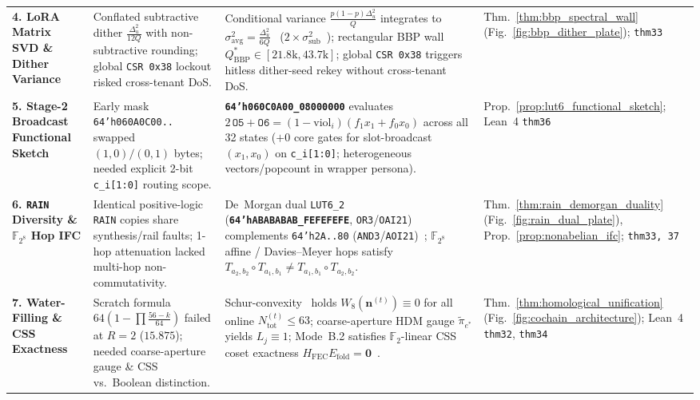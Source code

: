 \documentclass[10pt,twocolumn]{article}
\theoremstyle{spectralthm}
\begin{document}
\begin{table}[!tp]
\begin{tabularx}{\textwidth}{@{}>{\raggedright\hyphenpenalty=10000\arraybackslash}p{3.05cm} >{\raggedright\arraybackslash}p{4.85cm} >{\raggedright\arraybackslash}X >{\raggedright\arraybackslash}p{2.95cm}@{}}
\textbf{4. LoRA Matrix SVD \& Dither Variance} & Conflated subtractive dither $\frac{\Delta_u^2}{12Q}$ with non-subtractive rounding; global \texttt{CSR 0x38} lockout risked cross-tenant DoS. & Conditional variance $\frac{p(1-p)\Delta_u^2}{Q}$ integrates to $\sigma_{\mathrm{avg}}^2 = \frac{\Delta_u^2}{6Q}$~\cite{wannamaker2000nonsubtractive} ($2\times \sigma_{\mathrm{sub}}^2$~\cite{schuchman1964dither}); rectangular BBP wall~\cite{benaych2012singular} $Q_{\mathrm{BBP}}^* \in [21.8\text{k}, 43.7\text{k}]$; global \texttt{CSR 0x38} triggers hitless dither-seed rekey without cross-tenant DoS. & Thm.~\ref{thm:bbp_spectral_wall} \newline (Fig.~\ref{fig:bbp_dither_plate}); \texttt{thm33} \\
\textbf{5. Stage-2 Broadcast Functional Sketch} & Early mask \texttt{64'h060A0C00..} swapped $(1,0)/(0,1)$ bytes; needed explicit 2-bit \texttt{c\_i[1:0]} routing scope. & \textbf{\texttt{64'h060C0A00\_08000000}} evaluates $2\,\texttt{O5}+\texttt{O6} = (1-\mathrm{viol}_i)(f_1 x_1 + f_0 x_0)$ across all 32 states ($+0$ core gates for slot-broadcast $(x_1,x_0)$ on \texttt{c\_i[1:0]}; heterogeneous vectors/popcount in wrapper persona). & Prop.~\ref{prop:lut6_functional_sketch}; \newline Lean~4 \texttt{thm36} \\
\textbf{6. \texttt{RAIN} Diversity \& $\mathbb{F}_{2^8}$ Hop IFC} & Identical positive-logic \texttt{RAIN} copies share synthesis/rail faults; 1-hop attenuation lacked multi-hop non-commutativity. & De~Morgan dual \mbox{\texttt{LUT6\_2}} (\textbf{\texttt{64'hABABABAB\_FEFEFEFE}}, \texttt{OR3}/\texttt{OAI21}) complements \texttt{64'h2A..80} (\texttt{AND3}/\texttt{AOI21})~\cite{mitra2000commonmode}; $\mathbb{F}_{2^8}$ affine / Davies--Meyer hops satisfy $T_{a_2,b_2}\circ T_{a_1,b_1} \neq T_{a_1,b_1}\circ T_{a_2,b_2}$. & Thm.~\ref{thm:rain_demorgan_duality} (Fig.~\ref{fig:rain_dual_plate}), Prop.~\ref{prop:nonabelian_ifc}; \texttt{thm33, 37} \\
\textbf{7. Water-Filling \& CSS Exactness} & Scratch formula $64(1-\prod \frac{56-k}{64})$ failed at $R=2$ ($15.875$); needed coarse-aperture gauge \& CSS vs.\ Boolean distinction. & Schur-convexity~\cite{marshall2011inequalities} holds $W_8(\mathbf{n}^{(t)}) \equiv 0$ for all online $N_{\mathrm{tot}}^{(t)} \le 63$; coarse-aperture HDM gauge $\widetilde{\pi}_{e^*}$ yields $L_j \equiv 1$; Mode~B.2 satisfies $\mathbb{F}_2$-linear CSS coset exactness $H_{\mathrm{FEC}}E_{\mathrm{fold}} = \mathbf{0}$~\cite{calderbank1996good}. & Thm.~\ref{thm:homological_unification} (Fig.~\ref{fig:cochain_architecture}); \newline Lean~4 \texttt{thm32}, \texttt{thm34} \\
\bottomrule
\end{tabularx}
\end{table}
\end{document}
